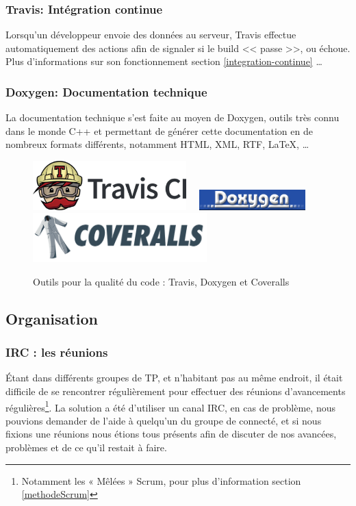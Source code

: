 \subsubsection{Travis: Intégration continue}
Lorsqu'un développeur envoie des données au serveur, Travis effectue automatiquement des actions afin de signaler si le build << passe >>,
ou échoue. Plus d'informations sur son fonctionnement section \ref{integration-continue} \ldots

\subsubsection{Doxygen: Documentation technique}
La documentation technique s'est faite au moyen de Doxygen, outils très connu dans le monde C++ et permettant de générer cette documentation
en de nombreux formats différents, notamment HTML, XML, RTF, \LaTeX{}, \ldots

\begin{figure}[H]
	\centering
\includegraphics[height=1.9cm]{../beamer/logos/travis.png}~~
\includegraphics[height=0.8cm]{../beamer/logos/doxygen.png}~~
\includegraphics[height=1.9cm]{../beamer/logos/coveralls.png}
\caption{Outils pour la qualité du code : Travis, Doxygen et Coveralls}
\end{figure}
\subsection{Organisation}
\subsubsection{IRC : les réunions}
Étant dans différents groupes de TP, et n'habitant pas au même endroit, il était difficile de se rencontrer régulièrement pour effectuer des
réunions d'avancements régulières\footnote{Notamment les « Mêlées » Scrum, pour plus d'information section \ref{methodeScrum}}. La solution a été
d'utiliser un canal IRC, en cas de problème, nous pouvions demander de l'aide à quelqu'un du groupe de connecté, et si nous fixions une
réunions nous étions tous présents afin de discuter de nos avancées, problèmes et de ce qu'il restait à faire.

